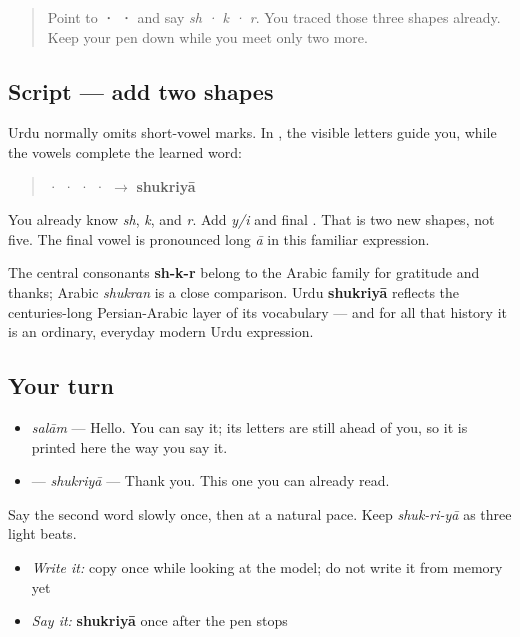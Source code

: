 \begin{quote}
Point to \textbf{ ·  · } and say \emph{sh · k · r}. You traced those three shapes already. Keep your pen down while you meet only two more.
\end{quote}

\subsection*{Script — add two shapes}
Urdu normally omits short-vowel marks. In \textbf{}, the visible letters guide you, while the vowels complete the learned word:

\begin{quote}
 ·  ·  ·  ·  $\to$ \textbf{shukriyā}
\end{quote}

You already know \textbf{} \emph{sh}, \textbf{} \emph{k}, and \textbf{} \emph{r}. Add \textbf{} \emph{y/i} and final \textbf{}. That is two new shapes, not five. The final vowel is pronounced long \emph{ā} in this familiar expression.

\begin{cousinweb}
The central consonants \textbf{sh-k-r} belong to the Arabic family for gratitude and thanks; Arabic \emph{shukran} is a close comparison. Urdu \textbf{shukriyā} reflects the centuries-long Persian-Arabic layer of its vocabulary — and for all that history it is an ordinary, everyday modern Urdu expression.
\end{cousinweb}

\subsection*{Your turn}
\begin{itemize}
\raggedright
  \item \emph{salām} — Hello. You can say it; its letters are still ahead of you, so it is printed here the way you say it.
  \item \textbf{} — \emph{shukriyā} — Thank you. This one you can already read.
\end{itemize}

Say the second word slowly once, then at a natural pace. Keep \emph{shuk-ri-yā} as three light beats.

\begin{itemize}
\raggedright
  \item \emph{Write it:} copy \textbf{} once while looking at the model; do not write it from memory yet
  \item \emph{Say it:} \textbf{shukriyā} once after the pen stops
\end{itemize}

